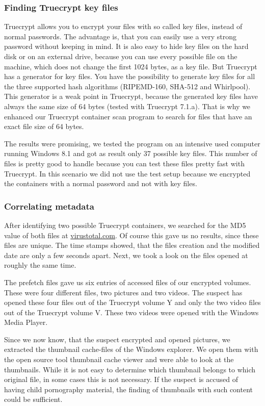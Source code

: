 \subsubsection{Finding Truecrypt key files}
Truecrypt allows you to encrypt your files with so called key files, instead of normal passwords. 
The advantage is, that you can easily use a very strong password without keeping in mind. 
It is also easy to hide key files on the hard disk or on an external drive, because you can use every possible file on the machine, which does not change the first 1024 bytes, as a key file. 
But Truecrypt has a generator for key files. 
You have the possibility to generate key files for all the three supported hash algorithms (RIPEMD-160, SHA-512 and Whirlpool). 
This generator is a weak point in Truecrypt, because the generated key files have always the same size of 64 bytes (tested with Truecrypt 7.1.a). 
That is why we enhanced our Truecrypt container scan program to search for files that have an exact file size of 64 bytes.

The results were promising, we tested the program on an intensive used computer running Windows 8.1 and got as result only 37 possible key files. 
This number of files is pretty good to handle because you can test these files pretty fast with Truecrypt. 
In this scenario we did not use the test setup because we encrypted the containers with a normal password and not with key files.
\subsubsection{Correlating metadata}
After identifying two possible Truecrypt containers, we searched for the MD5 value of both files at \url{virustotal.com}. 
Of course this gave us no results, since these files are unique. 
The time stamps showed, that the files creation and the modified date are only a few seconds apart. 
Next, we took a look on the files opened at roughly the same time. 

The prefetch files gave us six entries of accessed files of our encrypted volumes. 
These were four different files, two pictures and two videos.
The suspect has opened these four files out of the Truecrypt volume Y and only the two video files out of the Truecrypt volume V. 
These two videos were opened with the Windows Media Player.

Since we now know, that the suspect encrypted and opened pictures, we extracted the thumbnail cache-files of the Windows explorer. 
We open them with the open source tool thumbnail cache viewer and were able to look at the thumbnails. 
While it is not easy to determine which thumbnail belongs to which original file, in some cases this is not necessary. 
If the suspect is accused of having child pornography material, the finding of thumbnails with such content could be sufficient.

